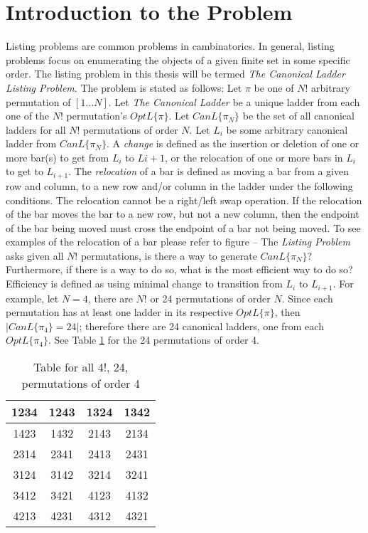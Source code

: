 \section{Introduction to the Problem}
Listing problems are common problems in cambinatorics. In general, listing problems 
focus on enumerating the objects of a given finite set in some specific order. The listing problem in this thesis 
will be termed \emph{The Canonical Ladder Listing Problem}. The problem is stated as follows: Let $\pi$ be one of $N!$ arbitrary permutation of $[1 \dots N]$. 
Let \emph{The Canonical Ladder} be a unique ladder from each one of the $N!$ permutation's $OptL\{\pi\}$. Let $CanL\{\pi_{N}\}$ be the set of all canonical ladders for 
all $N!$ permutations of order $N$. Let $L_{i}$ be some arbitrary canonical ladder from $CanL\{\pi_{N}\}$. A \emph{change} 
is defined as the insertion or deletion of one or more bar(s) to get from $L_{i}$ to $L{i+1}$, or the relocation of one or more bars in $L_{i}$ to get to $L_{i+1}$. 
The \emph{relocation} of a bar is defined as moving a bar from a given row and column, to a new row and/or column in the ladder under the following conditions.
The relocation cannot be a right/left swap operation. If the relocation of the bar moves the bar to a new row, but not a new column, then the endpoint 
of the bar being moved must cross the endpoint of a bar not being moved. To see examples of the relocation of a bar please refer to figure -- 
The \emph{Listing Problem} asks given all $N!$ permutations, is there a way to generate $CanL\{\pi_{N}\}$? 
Furthermore, if there is a way to do so, what is the most efficient way to do so? Efficiency is defined as 
using minimal change to transition from $L_{i}$ to $L_{i+1}$. For example, let $N=4$, there are $N!$ or 24 permutations 
of order $N$. Since each permutation has at least one ladder in its respective $OptL\{\pi\}$, then $|CanL\{\pi_{4}\}=24|$; therefore there are 24 canonical ladders, one from each $OptL\{\pi_{4}\}$. 
See Table \ref{table:aa} for the 24 permutations of order 4.

\begin{center}
\begin{table}[ht]
    \caption{Table for all 4!, 24, permutations of order 4} 

    \centering
       \begin{tabular}{|c |c |c |c |}
        \hline
        1234 & 1243 & 1324 & 1342 \\ \hline
        1423 & 1432 & 2143 & 2134 \\ \hline 
        2314 & 2341 & 2413 & 2431 \\ \hline 
        3124 & 3142 & 3214 & 3241 \\ \hline 
        3412 & 3421 & 4123 & 4132 \\ \hline 
        4213 & 4231 & 4312 & 4321 \\ \hline 
        
    \end{tabular}
    \label{table:aa}
 \end{table}
\end{center}


